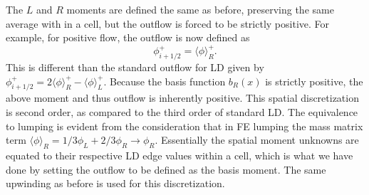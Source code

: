 \documentclass{mc2013}
\newcommand{\mom}[1]{\langle #1 \rangle}
\begin{document}
The $L$ and $R$ moments are defined the same as before,
preserving the same average with in a cell, but the outflow is forced to be strictly positive.  For example, for positive flow,
the outflow is now defined as
\begin{equation}
    \phi^+_{i+1/2} = \mom{\phi}_R^+.
\end{equation}
This is different than the standard outflow for LD given by $\phi^+_{i+1/2} =
2\mom{\phi}_R^+ - \mom{\phi}_L^+$. 
Because the basis function $b_R(x)$ is strictly positive, the above moment and thus outflow is
inherently positive.  This spatial discretization is second order, as compared to the 
third order of standard LD.  The equivalence to lumping is evident from the
consideration that
in FE lumping the mass matrix term $\mom{\phi}_R=1/3 \phi_L + 2/3 \phi_R \rightarrow
\phi_R$.  Essentially the spatial moment unknowns are equated to their respective
LD edge values within a cell,
which is what we have done by setting the outflow to be defined as the basis moment.
The same upwinding as before is used for this discretization.

\end{document}

